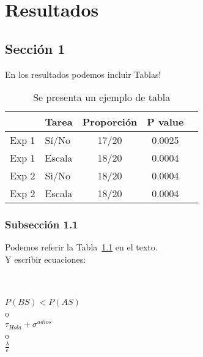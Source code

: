 
\chapter{Resultados} %
\label{Cap_Res} %


\section{Sección 1}

En los resultados podemos incluir Tablas!\\

\begin{table}
\caption[Tabla de Ejemplo]{Se presenta un ejemplo de tabla}
\label{Tabla}
\centering
\begin{tabular}{l l | c c c}  %
\toprule
\textbf{} & \textbf{Tarea} & \textbf{Proporción} & \textbf{P value}\\
\midrule
Exp 1 & Sí/No & 17/20 & 0.0025 \\
Exp 1 & Escala & 18/20 & 0.0004\\
Exp 2 & Sì/No & 18/20 & 0.0004\\
Exp 2 & Escala & 18/20 & 0.0004\\
\bottomrule
\end{tabular}
\end{table}

\subsection{Subsección 1.1}

Podemos referir la Tabla~\ref{Tabla} en el texto.\\

Y escribir ecuaciones:\\
\\
\\

\begin{center}
\Huge $P(BS) < P(AS)$\\
o\\
$\tau_{Hola} + \sigma^{adios}$\\
o\\
$\frac{\lambda}{\epsilon}$
\end{center}
